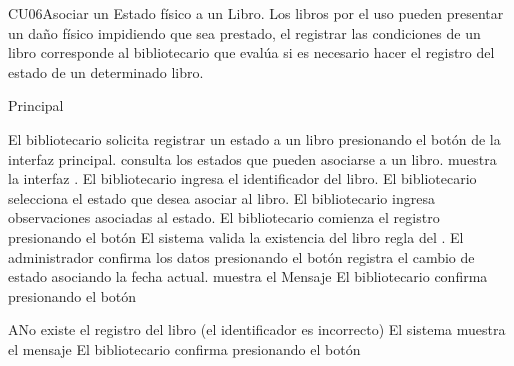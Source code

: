 
	\begin{UseCase}{CU06}{Asociar un Estado físico a un Libro.}{
		Los libros por el uso pueden presentar un daño físico  impidiendo que sea prestado, el registrar las condiciones de un libro corresponde al bibliotecario que evalúa si es necesario hacer el registro del estado de un determinado libro. 
	}
		
	\end{UseCase}
	\begin{UCtrayectoria}{Principal}

	\UCpaso[\UCactor] El bibliotecario solicita registrar un estado a un libro  presionando el botón   de la interfaz principal.      
	\UCpaso[\UCsist]  consulta los estados que pueden asociarse a un libro.  
	\UCpaso[\UCsist]  muestra la interfaz .
	\UCpaso[\UCactor] El bibliotecario ingresa el identificador del libro. 
	\UCpaso[\UCactor] El bibliotecario selecciona el estado que desea asociar al libro.
	\UCpaso[\UCactor] El bibliotecario ingresa observaciones asociadas al estado. 
	\UCpaso[\UCactor] El bibliotecario comienza el registro presionando el botón  
	\UCpaso[\UCsist]  El sistema valida la existencia del libro regla del . 
	\UCpaso[\UCactor] El administrador confirma los datos presionando el botón  
	\UCpaso[\UCsist]  registra el cambio de estado asociando la fecha actual. 
	\UCpaso[\UCsist]  muestra el Mensaje  
	\UCpaso[\UCactor] El bibliotecario confirma presionando el botón 

			
	\end{UCtrayectoria}					
		\begin{UCtrayectoriaA}{A}{No existe el registro del libro (el identificador es incorrecto) }
			\UCpaso[\UCsist] El sistema muestra el mensaje   
			\UCpaso[\UCactor] El bibliotecario confirma presionando el botón 
	\end{UCtrayectoriaA}
		
